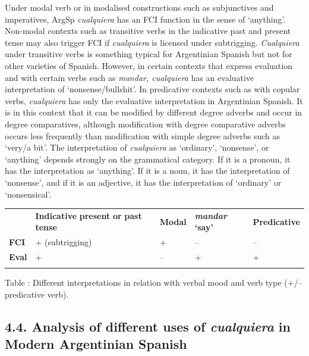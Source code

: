 \documentclass[output=paper]{langscibook}
\begin{document}
Under modal verb or in modalised constructions such as subjunctives and imperatives, ArgSp \textit{cualquiera} has an FCI function in the sense of ‘anything’. Non-modal contexts such as transitive verbs in the indicative past and present tense may also trigger FCI if \textit{cualquiera} is licensed under subtrigging. \textit{Cualquiera} under transitive verbs is something typical for Argentinian Spanish but not for other varieties of Spanish. However, in certain contexts that express evaluation and with certain verbs such as \textit{mandar, cualquiera} has an evaluative interpretation of ‘nonsense/bullshit’. In predicative contexts such as with copular verbs, \textit{cualquiera} has only the evaluative interpretation in Argentinian Spanish. It is in this context that it can be modified by different degree adverbs and occur in degree comparatives, although modification with degree comparative adverbs occurs less frequently than modification with simple degree adverbs such as ‘very/a bit’. The interpretation of \textit{cualquiera} as ‘ordinary’, ‘nonsense’, or ‘anything’ depends strongly on the grammatical category. If it is a pronoun, it has the interpretation as ‘anything’. If it is a noun, it has the interpretation of ‘nonsense’, and if it is an adjective, it has the interpretation of ‘ordinary’ or ‘nonsensical’.


\begin{tabularx}{\textwidth}{XXXXX}

\lsptoprule
\multicolumn{1}{c}{} & \textbf{Indicative} \textbf{present} \textbf{or} \textbf{past} \textbf{tense} & \textbf{Modal} & \textbf{\textit{mandar} }\textbf{‘say’} & \textbf{Predicative}\\
 \textbf{FCI} & + (subtrigging) & + & – & –\\
 \textbf{Eval} & + & – & + & +\\
\lspbottomrule
\end{tabularx}
\begin{styletablecaption}
Table : Different interpretations in relation with verbal mood and verb type (+/– predicative verb).
\end{styletablecaption}

\subsection{\textbf{4.4.} \textbf{Analysis} \textbf{of} \textbf{different} \textbf{uses} \textbf{of} \textbf{\textit{cualquiera}}\textbf{ }\textbf{in} \textbf{Modern} \textbf{Argentinian} \textbf{Spanish}}
\end{document}
